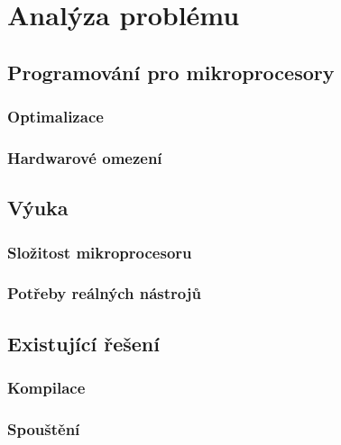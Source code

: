 \chapter{Analýza problému}

\blind[1]

\section{Programování pro mikroprocesory}

\blind[1]

\subsection{Optimalizace}

\blind[1]

\subsection{Hardwarové omezení}

\blind[1]

\section{Výuka}

\blind[2]

\subsection{Složitost mikroprocesoru}

\blind[2]

\subsection{Potřeby reálných nástrojů}

\blind[1]

\section{Existující řešení}

\blind[1]

\subsection{Kompilace}

\blind[2]

\subsection{Spouštění}

